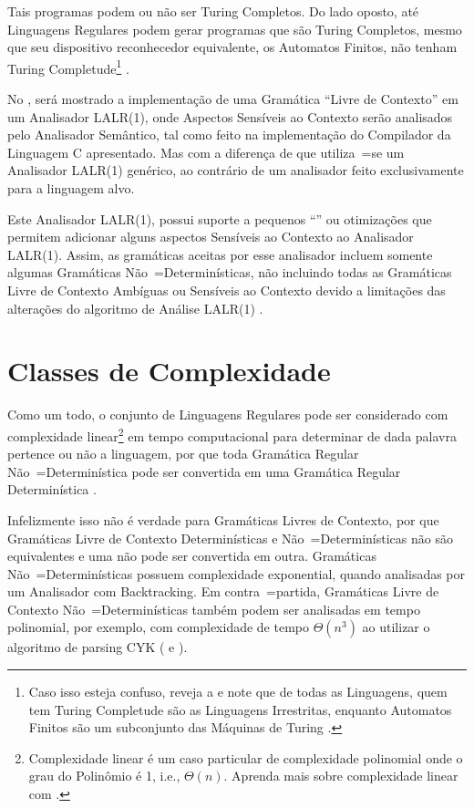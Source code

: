 Tais programas podem ou
não ser Turing Completos.
Do lado oposto,
até Linguagens Regulares podem gerar programas que são Turing Completos,
mesmo que seu dispositivo reconhecedor equivalente,
os Automatos Finitos,
não tenham Turing Completude\footnote{
Caso isso esteja confuso,
reveja a  e
note que de todas as Linguagens,
quem tem Turing Completude são as Linguagens Irrestritas,
enquanto Automatos Finitos são um subconjunto das Máquinas de Turing \cite{finiteAutomataTuringComplete}.
}
\cite{turingCompleteRegularLanguages,finiteAutomataTuringComplete}.

No ,
será mostrado a implementação de uma Gramática ``Livre de Contexto'' em um Analisador LALR(1),
onde Aspectos Sensíveis ao Contexto serão analisados pelo Analisador Semântico,
tal como feito na implementação do Compilador da Linguagem C apresentado.
Mas com a diferença de que utiliza~=se um Analisador LALR(1) genérico,
ao contrário de um analisador feito exclusivamente para a linguagem alvo.

Este Analisador LALR(1),
possui suporte a pequenos ``\textit{}'' ou
otimizações que permitem adicionar alguns aspectos Sensíveis ao Contexto ao Analisador LALR(1).
Assim,
as gramáticas aceitas por esse analisador incluem somente algumas Gramáticas Não~=Determinísticas,
não incluindo todas as Gramáticas Livre de Contexto Ambíguas ou
Sensíveis ao Contexto devido a limitações das alterações do algoritmo de Análise LALR(1) \cite{larkContextualLexer}.


\section{Classes de Complexidade}
\label{classesDeComplexidade}

Como um todo,
o conjunto de Linguagens Regulares pode ser considerado com complexidade linear\footnote{
Complexidade linear é um caso particular de complexidade polinomial onde o grau do Polinômio é 1,
i.e.,
$\Theta(n)$.
Aprenda mais sobre complexidade linear com .
}
em tempo computacional para determinar de dada palavra pertence ou
não a linguagem,
por que toda Gramática Regular Não~=Determinística pode ser convertida em uma Gramática Regular Determinística \cite{sipserBook}.

Infelizmente isso não é verdade para Gramáticas Livres de Contexto,
por que Gramáticas Livre de Contexto Determinísticas e
Não~=Determinísticas não são equivalentes e
uma não pode ser convertida em outra.
Gramáticas Não~=Determinísticas possuem complexidade exponential,
quando analisadas por um Analisador com Backtracking.
Em contra~=partida,
Gramáticas Livre de Contexto Não~=Determinísticas também podem ser analisadas em tempo polinomial,
por exemplo,
com complexidade de tempo $\Theta(n^3)$ ao utilizar o algoritmo de parsing CYK ( e
).


